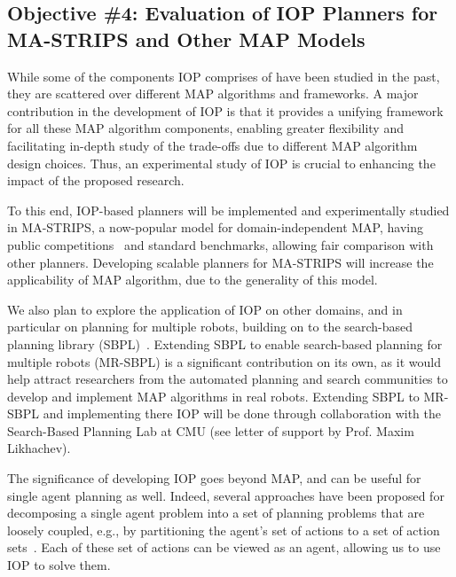 \documentclass[11pt]{article}
\begin{document}
\subsection{Objective \#4: Evaluation of IOP Planners for MA-STRIPS and Other MAP Models}

While some of the components IOP comprises of have been studied in the past, they are scattered over different MAP algorithms and frameworks. A major contribution in the development of IOP is that it provides a unifying framework for all these MAP algorithm components, enabling greater flexibility and facilitating in-depth study of the trade-offs due to different MAP algorithm design choices. Thus, an experimental study of IOP is crucial to enhancing the impact of the proposed research.

To this end, IOP-based planners will be implemented and experimentally studied in MA-STRIPS, a now-popular model for domain-independent MAP, having public competitions~\cite{vstolba2015competition} and standard benchmarks, allowing fair comparison with other planners. Developing scalable planners for MA-STRIPS will increase the applicability of MAP algorithm, due to the generality of this model. 

We also plan to explore the application of IOP on other domains, and in particular on planning for multiple robots, building on to the search-based planning library (SBPL)~\cite{likhachev2010sbpl}. Extending SBPL to enable search-based planning for multiple robots (MR-SBPL) is a significant contribution on its own, as it would help attract researchers from the automated planning and search communities to develop and implement MAP algorithms in real robots. Extending SBPL to MR-SBPL and implementing there IOP will be done through collaboration with the Search-Based Planning Lab at CMU (see letter of support by Prof. Maxim Likhachev). 



The significance of developing IOP goes beyond MAP, and can be useful for single agent planning as well. Indeed, several approaches have been proposed for decomposing a single agent problem into a set of planning problems that are loosely coupled, e.g., by partitioning the agent's set of actions to a set of action sets~\cite{amir2003factored,nissim2012tunneling}. Each of these set of actions can be viewed as an agent, allowing us to use IOP to solve them. 
\end{document}
